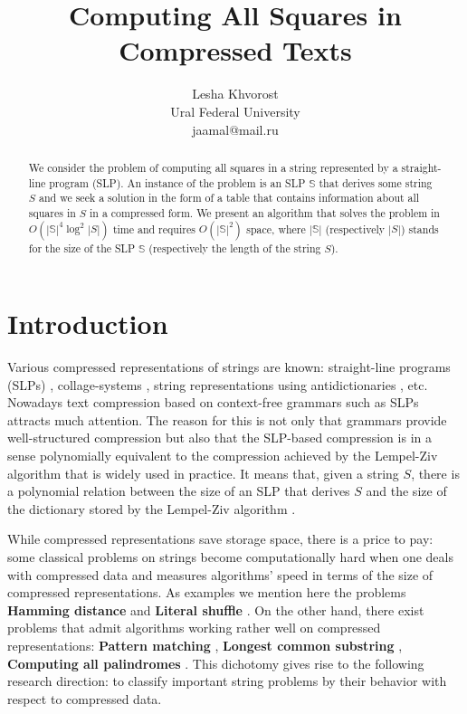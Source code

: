 \documentclass[11pt]{article}
\theoremstyle{break}
\newcommand{\slp}[1]{\mathbb{#1}}
\begin{document}
\title{Computing All Squares in Compressed Texts}
\author{Lesha Khvorost\\
Ural Federal University\\
jaamal@mail.ru}
\date{}
\maketitle

\begin{abstract}
We consider the problem of computing all squares in a string represented by a straight-line program (SLP). An instance of the problem is an
SLP $\slp{S}$ that derives some string $S$ and we seek a solution in the form of a table that contains information about all squares in $S$
in a compressed form. We present an algorithm that solves the problem in $O(|\slp{S}|^4\log^2{|S|})$ time and requires $O(|\slp{S}|^2)$
space, where $|\slp{S}|$ (respectively $|S|$) stands for the size of the SLP $\slp{S}$ (respectively the length of the string $S$).
\end{abstract}

\section{Introduction}

Various compressed representations of strings are known: straight-line programs (SLPs) \cite{14,15,16,18},
collage-systems \cite{12}, string representations using antidictionaries \cite{13}, etc. Nowadays text compression
based on context-free grammars such as SLPs attracts much attention. The reason for this is not only that grammars
provide well-structured compression but also that the SLP-based compression is in a sense polynomially equivalent
to the compression achieved by the Lempel-Ziv algorithm that is widely used in practice. It means that, given a
string $S$, there is a polynomial relation between the size of an SLP that derives $S$ and the size of the
dictionary stored by the Lempel-Ziv algorithm \cite{18}.

While compressed representations save storage space, there is a price to pay: some classical problems on strings become computationally
hard when one deals with compressed data and measures algorithms' speed in terms of the size of compressed representations. As examples we
mention here the problems \textbf{Hamming distance} \cite{15} and \textbf{Literal shuffle} \cite{4}. On the other hand, there exist
problems that admit algorithms working rather well on compressed representations: \textbf{Pattern matching} \cite{15,10}, \textbf{Longest
common substring} \cite{16}, \textbf{Computing all palindromes} \cite{16}. This dichotomy gives rise to the following research direction:
to classify important string problems by their behavior with respect to compressed data.
\end{document}
